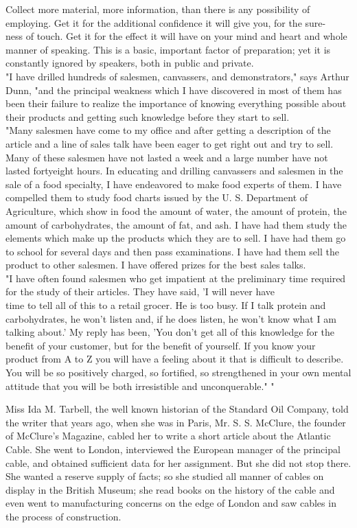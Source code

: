 \documentclass[10pt]{article}
\begin{document}
Collect more material, more information, than there is any possibility of employing. Get it for the additional confidence it will give you, for the sure-\\
ness of touch. Get it for the effect it will have on your mind and heart and whole manner of speaking. This is a basic, important factor of preparation; yet it is constantly ignored by speakers, both in public and private.\\
"I have drilled hundreds of salesmen, canvassers, and demonstrators," says Arthur Dunn, "and the principal weakness which I have discovered in most of them has been their failure to realize the importance of knowing everything possible about their products and getting such knowledge before they start to sell.\\
"Many salesmen have come to my office and after getting a description of the article and a line of sales talk have been eager to get right out and try to sell. Many of these salesmen have not lasted a week and a large number have not lasted fortyeight hours. In educating and drilling canvassers and salesmen in the sale of a food specialty, I have endeavored to make food experts of them. I have compelled them to study food charts issued by the U. S. Department of Agriculture, which show in food the amount of water, the amount of protein, the amount of carbohydrates, the amount of fat, and ash. I have had them study the elements which make up the products which they are to sell. I have had them go to school for several days and then pass examinations. I have had them sell the product to other salesmen. I have offered prizes for the best sales talks.\\
"I have often found salesmen who get impatient at the preliminary time required for the study of their articles. They have said, 'I will never have\\
time to tell all of this to a retail grocer. He is too busy. If I talk protein and carbohydrates, he won't listen and, if he does listen, he won't know what I am talking about.' My reply has been, 'You don't get all of this knowledge for the benefit of your customer, but for the benefit of yourself. If you know your product from A to Z you will have a feeling about it that is difficult to describe. You will be so positively charged, so fortified, so strengthened in your own mental attitude that you will be both irresistible and unconquerable." "

Miss Ida M. Tarbell, the well known historian of the Standard Oil Company, told the writer that years ago, when she was in Paris, Mr. S. S. McClure, the founder of McClure's Magazine, cabled her to write a short article about the Atlantic Cable. She went to London, interviewed the European manager of the principal cable, and obtained sufficient data for her assignment. But she did not stop there. She wanted a reserve supply of facts; so she studied all manner of cables on display in the British Museum; she read books on the history of the cable and even went to manufacturing concerns on the edge of London and saw cables in the process of construction.
\end{document}
